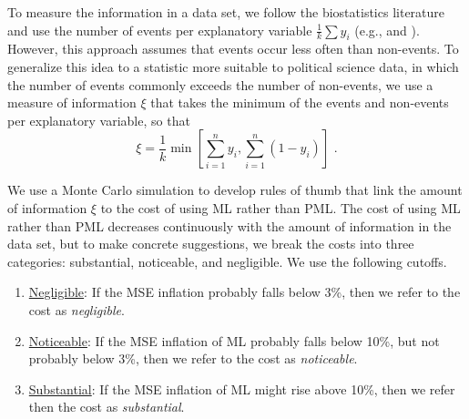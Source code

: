 \documentclass[12pt]{article}
\begin{document}
To measure the information in a data set, we follow the biostatistics literature and use the number of events per explanatory variable $\frac{1}{k}\sum y_i$ (e.g., \citealt{Peduzzietal1996} and \citealt{VittinghoffMcCulloch2007}).
However, this approach assumes that events occur less often than non-events. 
To generalize this idea to a statistic more suitable to political science data, in which the number of events commonly exceeds the number of non-events, we use a measure of information $\xi$ that takes the minimum of the events and non-events per explanatory variable, so that
\begin{equation}
\xi = \frac{1}{k}\min \left[ \sum_{i = 1}^n y_i, \sum_{i = 1}^n(1 - y_i) \right]\text{ .}
\end{equation}

We use a Monte Carlo simulation to develop rules of thumb that link the amount of information $\xi$ to the cost of using ML rather than PML. 
The cost of using ML rather than PML decreases continuously with the amount of information in the data set, but to make concrete suggestions, we break the costs into three categories: substantial, noticeable, and negligible.
We use the following cutoffs.
\begin{enumerate}
\item \underline{Negligible}: If the MSE inflation probably falls below 3\%, then we refer to the cost as \textit{negligible}.
\item \underline{Noticeable}: If the MSE inflation of ML probably falls below 10\%, but not probably below 3\%, then we refer to the cost as \textit{noticeable}.
\item \underline{Substantial}: If the MSE inflation of ML might rise above 10\%, then we refer then the cost as \textit{substantial}.
\end{enumerate}
\end{document}

